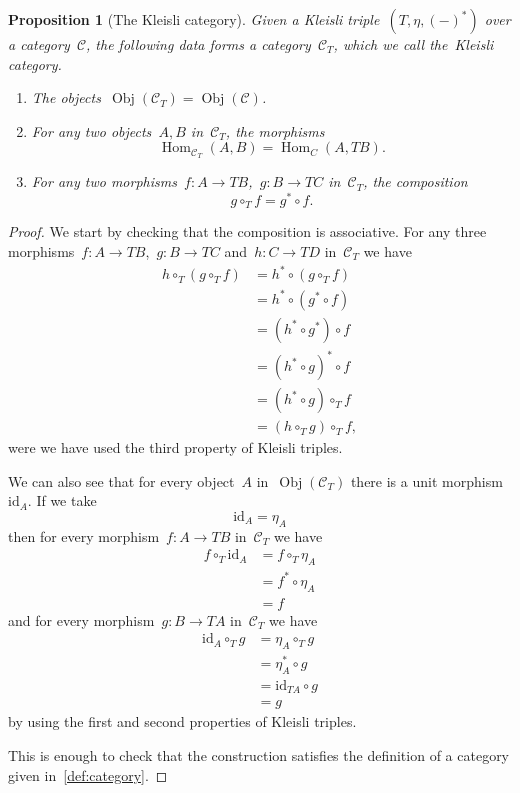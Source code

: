 \documentclass[a4paper]{article}
\theoremstyle{plain}
\newtheorem{proposition}[theorem]{Proposition}
\theoremstyle{definition}
\DeclareMathOperator{\Obj}{Obj}
\DeclareMathOperator{\Hom}{Hom}
\newcommand{\id}{\mathrm{id}}
\newcommand{\cat}[1]{\mathcal{#1}}
\begin{document}
\begin{proposition}[The Kleisli category]
    Given a Kleisli triple~\((T,\eta,(-)^{\ast})\) over a category~\(\cat{C}\),
    the following data forms a category~\(\cat{C}_{T}\), which we call
    the~\emph{Kleisli category}.
    \begin{enumerate}
        \item The objects~\(\Obj(\cat{C}_{T}) = \Obj(\cat{C})\).
        \item For any two objects~\(A,B\) in~\(\cat{C}_{T}\), the morphisms
            \[
                \Hom_{\cat{C}_{T}}(A,B) = \Hom_{C}(A,TB).
            \]
        \item For any two
            morphisms~\(f:A\longrightarrow TB\),~\(g:B\longrightarrow TC\)
            in~\(\cat{C}_{T}\), the composition
            \[
                g \circ_{T} f = g^{\ast} \circ f.
            \]
    \end{enumerate}
\end{proposition}
\begin{proof}
    We start by checking that the composition is associative. For any three
    morphisms~\(f:A\longrightarrow TB\),~\(g:B\longrightarrow TC\)
    and~\(h:C\longrightarrow TD\) in~\(\cat{C}_{T}\) we have
    \begin{align*}
        h \circ_{T} (g \circ_{T} f)
            &= h^{\ast} \circ (g \circ_{T} f) \\
            &= h^{\ast} \circ (g^{\ast} \circ f) \\
            &= (h^{\ast} \circ g^{\ast}) \circ f \\
            &= (h^{\ast} \circ g)^{\ast} \circ f \\
            &= (h^{\ast} \circ g) \circ_{T} f \\
            &= (h \circ_{T} g) \circ_{T} f,
    \end{align*}
    were we have used the third property of Kleisli triples.

    We can also see that for every object~\(A\) in~\(\Obj(\cat{C}_{T})\) there
    is a unit morphism~\(\id_{A}\). If we take
    \[
        \id_{A} = \eta_{A}
    \]
    then for every morphism~\(f:A\longrightarrow TB\) in~\(\cat{C}_{T}\) we have
    \begin{align*}
        f \circ_{T} \id_{A}
        &= f \circ_{T} \eta_{A} \\
        &= f^{\ast} \circ \eta_{A} \\
        &= f
    \end{align*}
    and for every morphism~\(g:B\longrightarrow TA\) in~\(\cat{C}_{T}\) we have
    \begin{align*}
        \id_{A} \circ_{T} g
        &= \eta_{A} \circ_{T} g \\
        &= \eta_{A}^{\ast} \circ g \\
        &= \id_{TA} \circ g \\
        &= g
    \end{align*}
    by using the first and second properties of Kleisli triples.

    This is enough to check that the construction satisfies the definition of a
    category given in~\ref{def:category}.
\end{proof}
\end{document}
